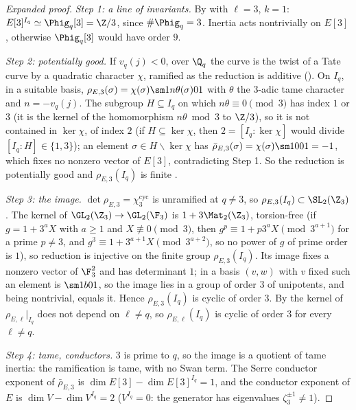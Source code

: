 \begin{sloppypar}
\begin{proof}[Expanded proof]
\emph{Step 1: a line of invariants.} By  with $\ell=3$, $k=1$: $E[3]^{I_q}\simeq\Phig_q[3]=\Z/3$, since $\#\Phig_q=3$. Inertia acts nontrivially on $E[3]$,
otherwise $\Phig_q[3]$ would have order $9$.

\emph{Step 2: potentially good.} If $v_q(j)<0$, over $\Q_q$ the curve is the twist of a Tate curve by a quadratic character $\chi$, ramified as the reduction is additive
(). On $I_q$, in a suitable basis, $\rho_{E,3}(\sigma)=\chi(\sigma)\sm1{n\theta(\sigma)}01$ with $\theta$ the $3$-adic tame character and $n=-v_q(j)$. The subgroup $H\subseteq I_q$
on which $n\theta\equiv0\pmod3$ has index $1$ or $3$ (it is the kernel of the homomorphism $n\theta\bmod3$ to $\Z/3$), so it is not contained in $\ker\chi$, of index $2$ (if $H\subseteq\ker\chi$,
then $2=[I_q:\ker\chi]$ would divide $[I_q:H]\in\{1,3\}$); an element $\sigma\in H\smallsetminus\ker\chi$ has $\bar\rho_{E,3}(\sigma)=\chi(\sigma)\sm1001=-1$, which fixes no nonzero vector of $E[3]$, contradicting
Step 1. So the reduction is potentially good and $\rho_{E,3}(I_q)$ is finite \cite[Section 2]{SerreTate68}.

\emph{Step 3: the image.} $\det\rho_{E,3}=\chi_3^{\mathrm{cyc}}$ is unramified at $q\ne3$, so $\rho_{E,3}(I_q)\subset\SL_2(\Z_3)$. The kernel of $\GL_2(\Z_3)\to\GL_2(\F_3)$ is $1+3\Mat_2(\Z_3)$,
torsion-free (if $g=1+3^aX$ with $a\ge1$ and $X\not\equiv0\pmod3$, then $g^p\equiv1+p3^aX\pmod{3^{a+1}}$ for a prime $p\ne3$, and $g^3\equiv1+3^{a+1}X\pmod{3^{a+2}}$, so
no power of $g$ of prime order is $1$), so reduction is injective on the finite group $\rho_{E,3}(I_q)$. Its image fixes a nonzero vector of $\F_3^2$ and has determinant $1$; in a basis
$(v,w)$ with $v$ fixed such an element is $\sm1b01$, so the image lies in a group of order $3$ of unipotents, and being nontrivial, equals it. Hence $\rho_{E,3}(I_q)$ is cyclic of
order $3$. By \cite[Section 2]{SerreTate68} the kernel of $\rho_{E,\ell}|_{I_q}$ does not depend on $\ell\ne q$, so $\rho_{E,\ell}(I_q)$ is cyclic of order $3$ for every $\ell\ne q$.

\emph{Step 4: tame, conductors.} $3$ is prime to $q$, so the image is a quotient of tame inertia: the ramification is tame, with no Swan term. The Serre conductor exponent
of $\bar\rho_{E,3}$ is $\dim E[3]-\dim E[3]^{I_q}=1$, and the conductor exponent of $E$ is $\dim V-\dim V^{I_q}=2$ ($V^{I_q}=0$: the generator has eigenvalues
$\zeta_3^{\pm1}\ne1$).


\end{proof}
\end{sloppypar}
